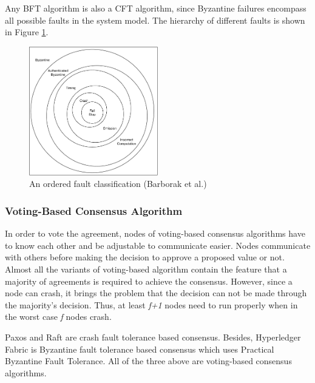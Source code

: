 \documentclass[12pt, a4paper]{article}
\begin{document}
Any BFT algorithm is also a CFT algorithm, since Byzantine failures encompass
all possible faults in the system model. The hierarchy of different faults
\cite{barborak1993consensus} is shown in Figure \ref{fig:aofc}.

\begin{figure}[htp]
  \centering
  \includegraphics[width=0.5\textwidth]{img/AOFC.pdf}
  \caption{An ordered fault classification (Barborak et al.)}
  \label{fig:aofc}
\end{figure}

\subsubsection{Voting-Based Consensus Algorithm}
In order to vote the agreement, nodes of voting-based consensus algorithms have to 
know each other and be adjustable to communicate easier\cite{nguyen2018survey}.
Nodes communicate with others before making the decision 
to approve a proposed value or not.
Almost all the variants of voting-based algorithm contain the feature
that a majority of agreements is required to achieve the consensus.
However, since a node can crash, it brings the problem that the decision can not
be made through the majority's decision. Thus, at least \textit{f+1} nodes need 
to run properly when in the worst case \textit{f} nodes crash. 

Paxos\cite{lamport2001paxos} and Raft\cite{conf/usenix/OngaroO14} are 
crash fault tolerance based consensus.
Besides, Hyperledger Fabric\cite{cachin2016architecture} is 
Byzantine fault tolerance based consensus which 
uses Practical Byzantine Fault Tolerance\cite{castro1999practical}.
All of the three above are voting-based consensus algorithms.
\end{document}
